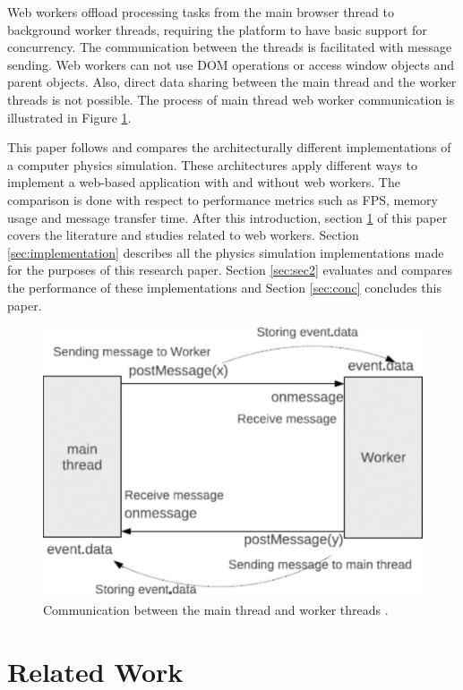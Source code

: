 \documentclass[conference]{IEEEtran}
\begin{document}
Web workers offload processing tasks from the main browser thread to background worker threads, requiring the platform to have basic support for concurrency. The communication between the threads is facilitated with message sending. Web workers can not use DOM operations or access window objects and parent objects. Also, direct data sharing between the main thread and the worker threads is not possible. The process of main thread web worker communication is illustrated in Figure \ref{fig:figure1}.
\cite{doha, watanabe}

This paper follows and compares the architecturally different implementations of a computer physics simulation. These architectures apply different ways to implement a 
web-based application with and without web workers. The comparison is done with respect to performance metrics such as FPS, memory usage and message transfer time. After this introduction, section \ref{sec:soa} of this paper covers the literature and studies related to web workers. Section \ref{sec:implementation} describes all the
physics simulation implementations made for the purposes of this research paper. Section \ref{sec:sec2} evaluates and compares the performance of these implementations and
Section \ref{sec:conc} concludes this paper.

\begin{figure}[ht]
	\centering
	\includegraphics[scale=0.25]{figs/figure1.png}
	\caption{Communication between the main thread and worker threads \cite{watanabe}.}
	\label{fig:figure1}
\end{figure}

\section{Related Work}
\label{sec:soa}
\end{document}
